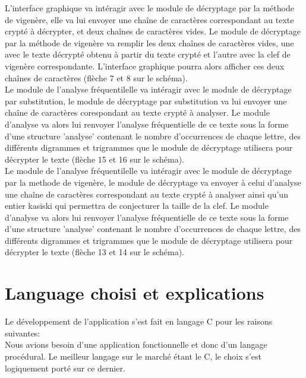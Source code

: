 \documentclass[a4]{article}
\begin{document}
	L'interface graphique va intéragir avec le module de décryptage par la méthode de vigenère, elle va lui envoyer une 
	chaîne de caractères correspondant au texte crypté à décrypter, et deux chaînes de caractères vides. Le module de 
	décryptage par la méthode de vigenère va remplir les deux chaînes de caractères vides, une avec le texte décrypté 
	obtenu à partir du texte crypté et l'autre avec la clef de vigenère correspondante. L'interface graphique pourra 
	alors afficher ces deux chaînes de caractères (flèche 7 et 8 sur le schéma). \\

	Le module de l'analyse fréquentilelle va intéragir avec le module de décryptage par substitution,
	le module de décryptage par substitution va lui envoyer une chaîne de caractères corespondant au texte 
	crypté à analyser. Le module d'analyse va alors lui renvoyer l'analyse fréquentielle de ce texte sous 
	la forme d'une structure 'analyse' contenant le nombre d'occurrences de chaque lettre, des différents digrammes 
	et trigrammes que le module de décryptage utilisera pour décrypter le texte (flèche 15 et 16 sur le schéma). \\

	Le module de l'analyse fréquentilelle va intéragir avec le module de décryptage par la methode de vigenère, 
	le module de décryptage va envoyer à celui d'analyse une chaîne de caractères correspondant au texte crypté à
	analyser ainsi qu'un entier kasiski qui permettra de conjecturer la taille de la clef. Le module d'analyse va 
	alors lui renvoyer l'analyse fréquentielle de ce texte sous la forme d'une structure 'analyse' contenant le nombre
	d'occurrences de chaque lettre, des différents digrammes et trigrammes que le module de décryptage utilisera pour 
	décrypter le texte (flèche 13 et 14 sur le schéma). \\


	\section{Language choisi et explications}
	
	Le développement de l'application s'est fait en langage C pour les raisons suivantes: \\
	
  Nous avions besoin d'une application fonctionnelle et donc d'un langage procédural. Le meilleur langage sur le marché
  étant le C, le choix s'est logiquement porté sur ce dernier.\\ \\
\end{document}
